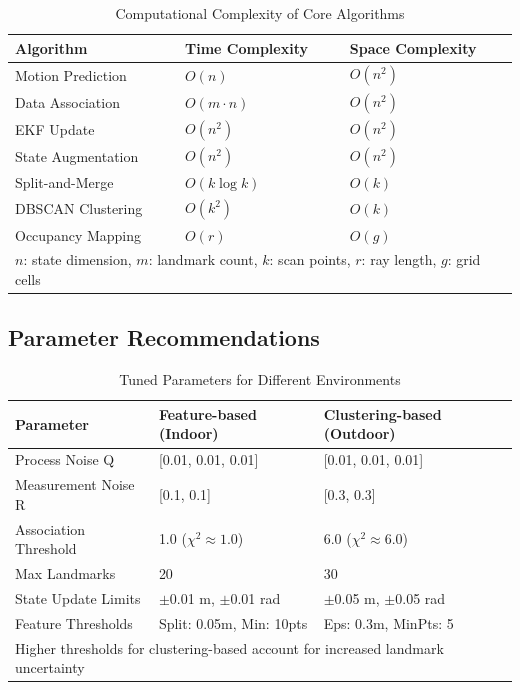 \documentclass[12pt,a4paper]{article}
\begin{document}
\begin{table}[H]
\centering
\caption{Computational Complexity of Core Algorithms}
\begin{tabular}{@{}lll@{}}
\toprule
\textbf{Algorithm} & \textbf{Time Complexity} & \textbf{Space Complexity} \\
\midrule
Motion Prediction & $O(n)$ & $O(n^2)$ \\
Data Association & $O(m \cdot n)$ & $O(n^2)$ \\
EKF Update & $O(n^2)$ & $O(n^2)$ \\
State Augmentation & $O(n^2)$ & $O(n^2)$ \\
Split-and-Merge & $O(k \log k)$ & $O(k)$ \\
DBSCAN Clustering & $O(k^2)$ & $O(k)$ \\
Occupancy Mapping & $O(r)$ & $O(g)$ \\
\midrule
\multicolumn{3}{l}{\footnotesize $n$: state dimension, $m$: landmark count, $k$: scan points, $r$: ray length, $g$: grid cells} \\
\bottomrule
\end{tabular}
\end{table}

\subsection*{Parameter Recommendations}

\begin{table}[H]
\centering
\caption{Tuned Parameters for Different Environments}
\begin{tabular}{@{}lll@{}}
\toprule
\textbf{Parameter} & \textbf{Feature-based (Indoor)} & \textbf{Clustering-based (Outdoor)} \\
\midrule
Process Noise Q & [0.01, 0.01, 0.01] & [0.01, 0.01, 0.01] \\
Measurement Noise R & [0.1, 0.1] & [0.3, 0.3] \\
Association Threshold & 1.0 ($\chi^2 \approx 1.0$) & 6.0 ($\chi^2 \approx 6.0$) \\
Max Landmarks & 20 & 30 \\
State Update Limits & $\pm$0.01 m, $\pm$0.01 rad & $\pm$0.05 m, $\pm$0.05 rad \\
Feature Thresholds & Split: 0.05m, Min: 10pts & Eps: 0.3m, MinPts: 5 \\
\midrule
\multicolumn{3}{l}{\footnotesize Higher thresholds for clustering-based account for increased landmark uncertainty} \\
\bottomrule
\end{tabular}
\end{table}
\end{document}
